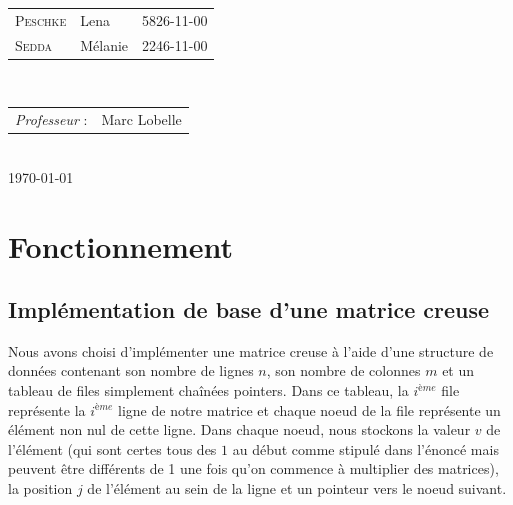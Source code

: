 \documentclass[12pt,a4paper]{article}
\begin{document}
\begin{titlepage}
\large 
{\begin{tabular}{lll}
\textsc{Peschke} & Lena & 5826-11-00\\
\textsc{Sedda} & Mélanie & 2246-11-00\\
\end{tabular}}
\\[1cm]

\normalsize
{\begin{tabular}{ll}
\textit{Professeur} : & Marc Lobelle \\
\end{tabular}}
\\[1cm]


{\normalsize \today}\\[3cm] %

\newpage

\end{titlepage}


\clearpage
\thispagestyle{empty}
\tableofcontents
\clearpage
{}


\section{Fonctionnement}


\subsection{Implémentation de base d'une matrice creuse}
Nous avons choisi d'implémenter une matrice creuse à l'aide d'une structure de données contenant son nombre de lignes $n$, son nombre de colonnes $m$ et un tableau de files simplement chaînées pointers. Dans ce tableau, la $i^{ème}$ file représente la  $i^{ème}$ ligne de notre matrice et chaque noeud de la file représente un élément non nul de cette ligne. Dans chaque noeud, nous stockons la valeur $v$ de l'élément (qui sont certes tous des $1$ au début comme stipulé dans l'énoncé mais peuvent être différents de 1 une fois qu'on commence à multiplier des matrices), la position $j$ de l'élément au sein de la ligne et un pointeur vers le noeud suivant.\\
\end{document}
